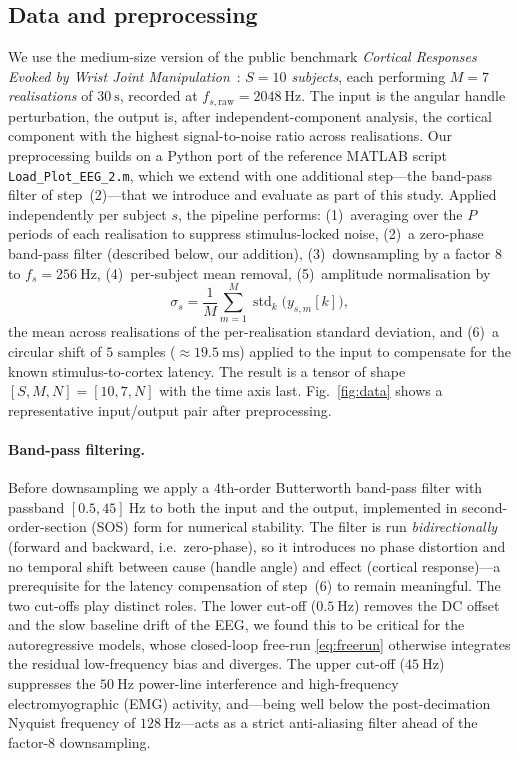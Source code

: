 \documentclass[10pt,twocolumn,letterpaper]{article}
\begin{document}
\subsection{Data and preprocessing}\label{sec:data}
We use the medium-size version of the public benchmark \emph{Cortical
Responses Evoked by Wrist Joint
Manipulation}~\cite{Vlaar2018,VlaarDataset}: \emph{$S=10$ subjects}, each
performing \emph{$M=7$ realisations} of $30~\mathrm{s}$, recorded at
$f_{s,\mathrm{raw}}=2048~\mathrm{Hz}$. The input is the angular handle
perturbation, the output is, after independent-component analysis, the
cortical component with the highest signal-to-noise ratio across
realisations. Our preprocessing builds on a Python port of the reference MATLAB
script \texttt{Load\_Plot\_EEG\_2.m}, which we extend with one additional
step---the band-pass filter of step~(2)---that we introduce and evaluate
as part of this study. Applied independently per
subject $s$, the pipeline performs: (1)~averaging over the $P$ periods of
each realisation to suppress stimulus-locked noise, (2)~a zero-phase
band-pass filter (described below, our addition), (3)~downsampling by a
factor $8$ to
$f_s=256~\mathrm{Hz}$, (4)~per-subject mean removal, (5)~amplitude
normalisation by
\begin{equation}
    \sigma_s = \frac{1}{M}\sum_{m=1}^{M}
               \operatorname{std}_k\big(y_{s,m}[k]\big),
    \label{eq:norm}
\end{equation}
the mean across realisations of the per-realisation standard deviation,
and (6)~a circular shift of $5$ samples ($\approx 19.5~\mathrm{ms}$)
applied to the input to compensate for the known stimulus-to-cortex
latency. The result is a tensor of shape $[S,M,N]=[10,7,N]$ with the time
axis last. Fig.~\ref{fig:data} shows a representative input/output pair
after preprocessing.

\paragraph{Band-pass filtering.}
Before downsampling we apply a $4$th-order Butterworth band-pass filter
with passband $[0.5,45]~\mathrm{Hz}$ to both the input and the output,
implemented in second-order-section (SOS) form for numerical stability.
The filter is run \emph{bidirectionally} (forward and backward, i.e.\
zero-phase), so it introduces no phase distortion and no temporal shift
between cause (handle angle) and effect (cortical response)---a
prerequisite for the latency compensation of step~(6) to remain
meaningful. The two cut-offs play distinct roles. The lower cut-off
($0.5~\mathrm{Hz}$) removes the DC offset and the slow baseline drift of
the EEG, we found this to be critical for the autoregressive models, whose
closed-loop free-run \eqref{eq:freerun} otherwise integrates the residual
low-frequency bias and diverges. The upper cut-off ($45~\mathrm{Hz}$)
suppresses the $50~\mathrm{Hz}$ power-line interference and
high-frequency electromyographic (EMG) activity, and---being well below
the post-decimation Nyquist frequency of $128~\mathrm{Hz}$---acts as a
strict anti-aliasing filter ahead of the factor-$8$ downsampling.
\end{document}
